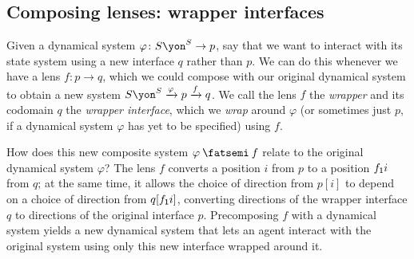 \documentclass[Book-Poly]{subfiles}
\begin{document}

\subsection{Composing lenses: wrapper interfaces}\label{subsec.poly.dyn_sys.new.wrap}


Given a dynamical system $\varphi\colon S\yon^S\to p$, say that we want to interact with its state system using a new interface $q$ rather than $p$.
We can do this whenever we have a lens $f\colon p\to q$, which we could compose with our original dynamical system to obtain a new system $S\yon^S\To{\varphi}p\To{f}q$.
We call the lens $f$ the \emph{wrapper} and its codomain $q$ the \emph{wrapper interface}, which we \emph{wrap} around $\varphi$ (or sometimes just $p$, if a dynamical system $\varphi$ has yet to be specified) using $f$.

How does this new composite system $\varphi\then f$ relate to the original dynamical system $\varphi$?
The lens $f$ converts a position $i$ from $p$ to a position $f_{\textsf{1}}i$ from $q$; at the same time, it allows the choice of direction from $p[i]$ to depend on a choice of direction from $q[f_{\textsf{1}}i]$, converting directions of the wrapper interface $q$ to directions of the original interface $p$.
Precomposing $f$ with a dynamical system yields a new dynamical system that lets an agent interact with the original system using only this new interface wrapped around it.
\end{document}
